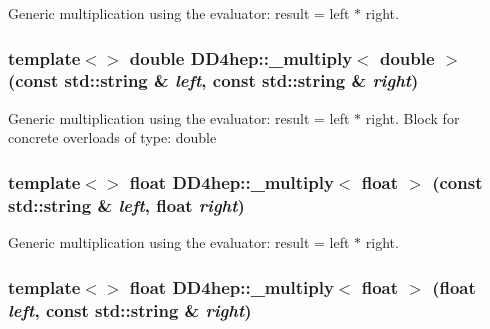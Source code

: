 Generic multiplication using the evaluator: result = left $\ast$ right. \hypertarget{group___d_d4_h_e_p___g_e_o_m_e_t_r_y_ga22e97dd98843857d9b401db28e27aa01}{
\subsubsection[{\_\-multiply$<$ double $>$}]{\setlength{\rightskip}{0pt plus 5cm}template$<$$>$ double DD4hep::\_\-multiply$<$ double $>$ (const std::string \& {\em left}, \/  const std::string \& {\em right})}}
\label{group___d_d4_h_e_p___g_e_o_m_e_t_r_y_ga22e97dd98843857d9b401db28e27aa01}


Generic multiplication using the evaluator: result = left $\ast$ right. Block for concrete overloads of type: double \hypertarget{group___d_d4_h_e_p___g_e_o_m_e_t_r_y_ga3badaa36725100fdd50bb670e3c2502f}{
\subsubsection[{\_\-multiply$<$ float $>$}]{\setlength{\rightskip}{0pt plus 5cm}template$<$$>$ float DD4hep::\_\-multiply$<$ float $>$ (const std::string \& {\em left}, \/  float {\em right})}}
\label{group___d_d4_h_e_p___g_e_o_m_e_t_r_y_ga3badaa36725100fdd50bb670e3c2502f}


Generic multiplication using the evaluator: result = left $\ast$ right. \hypertarget{group___d_d4_h_e_p___g_e_o_m_e_t_r_y_gab91a9667115aab054a1b31f47873fd85}{
\subsubsection[{\_\-multiply$<$ float $>$}]{\setlength{\rightskip}{0pt plus 5cm}template$<$$>$ float DD4hep::\_\-multiply$<$ float $>$ (float {\em left}, \/  const std::string \& {\em right})}}
\label{group___d_d4_h_e_p___g_e_o_m_e_t_r_y_gab91a9667115aab054a1b31f47873fd85}


